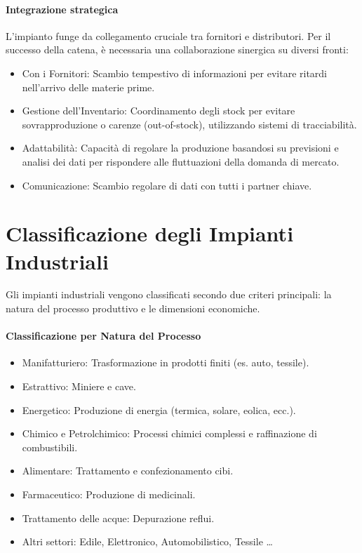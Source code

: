 \paragraph{Integrazione strategica} L'impianto funge da collegamento cruciale tra fornitori e distributori. Per il successo della catena, è necessaria una collaborazione sinergica su diversi fronti:
\begin{itemize}
    \item Con i Fornitori: Scambio tempestivo di informazioni per evitare ritardi nell'arrivo delle materie prime.
    \item Gestione dell'Inventario: Coordinamento degli stock per evitare sovrapproduzione o carenze (out-of-stock), utilizzando sistemi di tracciabilità.
    \item Adattabilità: Capacità di regolare la produzione basandosi su previsioni e analisi dei dati per rispondere alle fluttuazioni della domanda di mercato.
    \item Comunicazione: Scambio regolare di dati con tutti i partner chiave.
\end{itemize}
%
\section{Classificazione degli Impianti Industriali}
Gli impianti industriali vengono classificati secondo due criteri principali: la natura del processo produttivo e le dimensioni economiche.

%
\paragraph{Classificazione per Natura del Processo}
\begin{itemize}
    \item Manifatturiero: Trasformazione in prodotti finiti (es. auto, tessile).
    \item Estrattivo: Miniere e cave.
    \item Energetico: Produzione di energia (termica, solare, eolica, ecc.).
    \item Chimico e Petrolchimico: Processi chimici complessi e raffinazione di combustibili.
    \item Alimentare: Trattamento e confezionamento cibi.
    \item Farmaceutico: Produzione di medicinali.
    \item Trattamento delle acque: Depurazione reflui.
    \item Altri settori: Edile, Elettronico, Automobilistico, Tessile \dots
\end{itemize}

